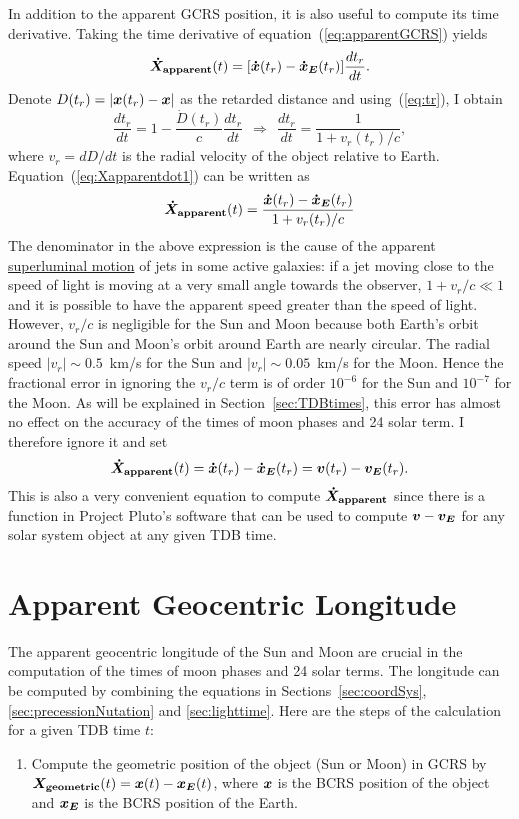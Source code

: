 \documentclass[12pt]{article}
\newcommand \beq {\begin{equation}}
\newcommand \eeq {\end{equation}}
\newcommand{\ve}[1]{\mbox{\boldmath $#1$}}
\begin{document}
\begin{CJK}{UTF8}{bkai}
In addition to the apparent GCRS position, it is also useful to compute its time 
derivative. Taking the time derivative of equation~(\ref{eq:apparentGCRS}) yields 
\beq
  \ve{\dot{X}_{\rm apparent}}(t) = [ \ve{\dot{x}}(t_r) - \ve{\dot{x}_E}(t_r) ] 
\frac{dt_r}{dt} .
\label{eq:Xapparentdot1}
\eeq
Denote $D(t_r) = |\ve{x}(t_r)-\ve{x}|$ as the retarded distance and 
using~(\ref{eq:tr}), I obtain 
\beq
  \frac{dt_r}{dt} = 1 - \frac{\dot{D}(t_r)}{c} \frac{dt_r}{dt}
\ \ \Rightarrow \ \ \frac{dt_r}{dt} = \frac{1}{1+v_r(t_r)/c} , 
\eeq
where $v_r =dD/dt$ is the radial velocity of the object relative to Earth. 
Equation~(\ref{eq:Xapparentdot1}) can be written as 
\beq
  \ve{\dot{X}_{\rm apparent}}(t) = \frac{\ve{\dot{x}}(t_r) - \ve{\dot{x}_E}(t_r)}{1+v_r(t_r)/c}
\eeq
The denominator in the above expression is the cause of 
the apparent \href{https://en.wikipedia.org/wiki/Superluminal_motion}{superluminal motion} 
of jets in some active galaxies: if a jet moving close to the speed of light
is moving at a very small angle towards the observer, $1+v_r/c \ll 1$ and
it is possible to have the apparent speed greater than the speed of light. 
However, $v_r/c$ is negligible for the Sun and Moon because both Earth's orbit around the Sun 
and Moon's orbit around Earth are nearly circular. The radial speed 
$|v_r| \sim 0.5$~km/s for the Sun and $|v_r| \sim 0.05$~km/s for the Moon. 
Hence the fractional error in ignoring the $v_r/c$ term is of order $10^{-6}$ for 
the Sun and $10^{-7}$ for the Moon. As will be explained in Section~\ref{sec:TDBtimes}, 
this error has almost no effect on the accuracy of the times of moon phases 
and 24 solar term. I therefore ignore it and set 
\beq
  \ve{\dot{X}_{\rm apparent}}(t) = \ve{\dot{x}}(t_r) - \ve{\dot{x}_E}(t_r) 
= \ve{v}(t_r) - \ve{v_E}(t_r) .
\label{eq:Xapparentdot2}
\eeq
This is also a very convenient equation to compute $\ve{\dot{X}_{\rm apparent}}$ 
since there is a function in Project Pluto's software that can be used to 
compute $\ve{v}-\ve{v_E}$ for any solar system object at any given TDB time.

\section{Apparent Geocentric Longitude}
\label{sec:longitude}

The apparent geocentric longitude of the Sun and Moon are crucial in the computation 
of the times of moon phases and 24 solar terms. The longitude can be computed by
combining the equations in Sections~\ref{sec:coordSys}, \ref{sec:precessionNutation}
and \ref{sec:lighttime}. Here are the steps of the calculation for a given 
TDB time $t$:
\begin{enumerate}
\item Compute the geometric position of the object (Sun or Moon) in GCRS 
by $\ve{X_{\rm geometric}}(t) = \ve{x}(t) - \ve{x_E}(t)$, where 
$\ve{x}$ is the BCRS position of the object and $\ve{x_E}$ is the BCRS 
position of the Earth. 


\end{enumerate}
\end{CJK}
\end{document}
